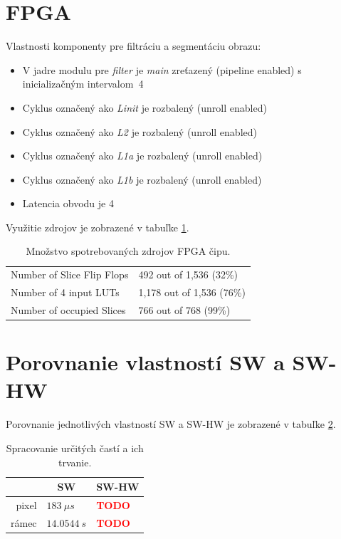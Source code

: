 \documentclass[11pt,a4paper]{article}
\newcommand{\TODO}{\textbf{\textcolor{red}{TODO}}}
\begin{document}
\section{FPGA}

Vlastnosti komponenty pre filtráciu a segmentáciu obrazu:

\begin{itemize}
    \item V jadre modulu pre \textit{filter} je \textit{main} zreťazený (pipeline enabled) s inicializačným intervalom~4
    \item Cyklus označený ako \textit{Linit} je rozbalený (unroll enabled)
    \item Cyklus označený ako \textit{L2} je rozbalený (unroll enabled)
    \item Cyklus označený ako \textit{L1a} je rozbalený (unroll enabled)
    \item Cyklus označený ako \textit{L1b} je rozbalený (unroll enabled)
    \item Latencia obvodu je 4
\end{itemize}

Využitie zdrojov je zobrazené v tabuľke \ref{tab:fpga_resources}.

\begin{table}[H]
  \begin{center}
    \begin{tabular}{l|l}
        Number of Slice Flip Flops & 492 \hspace{1.65mm} out of 1,536 (32\%) \\
        Number of 4 input LUTs     & 1,178 out of 1,536 (76\%) \\
        Number of occupied Slices  & 766 \hspace{1.65mm} out of 768 \hspace{1.65mm} (99\%)   \\
    \end{tabular}
    \caption{Množstvo spotrebovaných zdrojov FPGA čipu.}
    \label{tab:fpga_resources}
  \end{center}
\end{table}

\section{Porovnanie vlastností SW a SW-HW}

Porovnanie jednotlivých vlastností SW a SW-HW je zobrazené v tabuľke \ref{tab:compare}.

\begin{table}[H]
  \begin{center}
    \begin{tabular}{r|l|l}
        & \multicolumn{1}{c|}{\textbf{SW}} & \multicolumn{1}{c}{\textbf{SW-HW}}\\
        \hline
        pixel & $183 \ \mu s$ & \TODO\\
        rámec & $14.0544 \ s$ & \TODO\\
    \end{tabular}
    \caption{Spracovanie určitých častí a ich trvanie.}
    \label{tab:compare}
  \end{center}
\end{table}
\end{document}
